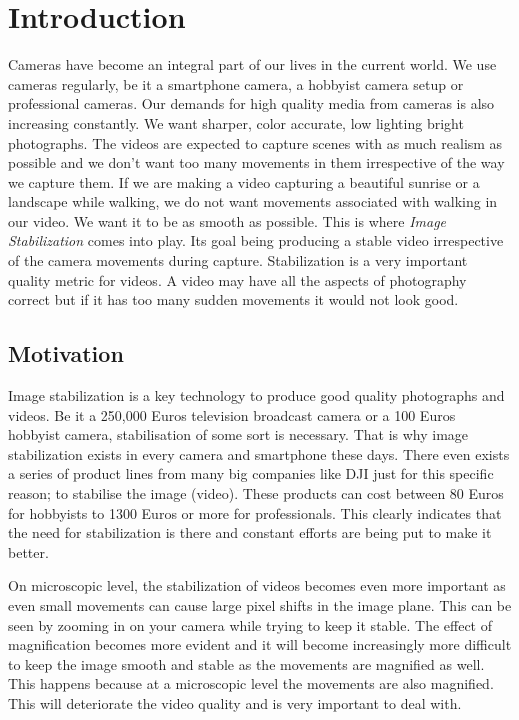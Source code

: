 \chapter{Introduction} \label{chapter_one}

Cameras have become an integral part of our lives in the current world. We use cameras regularly, be it a smartphone camera, a hobbyist camera setup or professional cameras. Our demands for high quality media from cameras is also increasing constantly. We want sharper, color accurate, low lighting bright photographs. The videos are expected to capture scenes with as much realism as possible and we don't want too many movements in them irrespective of the way we capture them. If we are making a video capturing a beautiful sunrise or a landscape while walking, we do not want movements associated with walking in our video. We want it to be as smooth as possible. This is where \textit{Image Stabilization} comes into play. Its goal being producing a stable video irrespective of the camera movements during capture. Stabilization is a very important quality metric for videos. A video may have all the aspects of photography correct but if it has too many sudden movements it would not look good.

\section{Motivation}

Image stabilization is a key technology to produce  good quality photographs and videos. Be it a 250,000 Euros television broadcast camera or a 100 Euros hobbyist camera, stabilisation of some sort is necessary. That is why image stabilization exists in every camera and smartphone these days. There even exists a series of product lines from many big companies like DJI just for this specific reason; to stabilise the image (video). These products can cost between 80 Euros for hobbyists to 1300 Euros or more for professionals. This clearly indicates that the need for stabilization is there and constant efforts are being put to make it better.

On microscopic level, the stabilization of videos becomes even more important as even small movements can cause large pixel shifts in the image plane. This can be seen by zooming in on your camera while trying to keep it stable. The effect of magnification becomes more evident and it will become increasingly more difficult to keep the image smooth and stable as the movements are magnified as well. This happens because at a microscopic level the movements are also magnified. This will deteriorate the video quality and is very important to deal with. 

